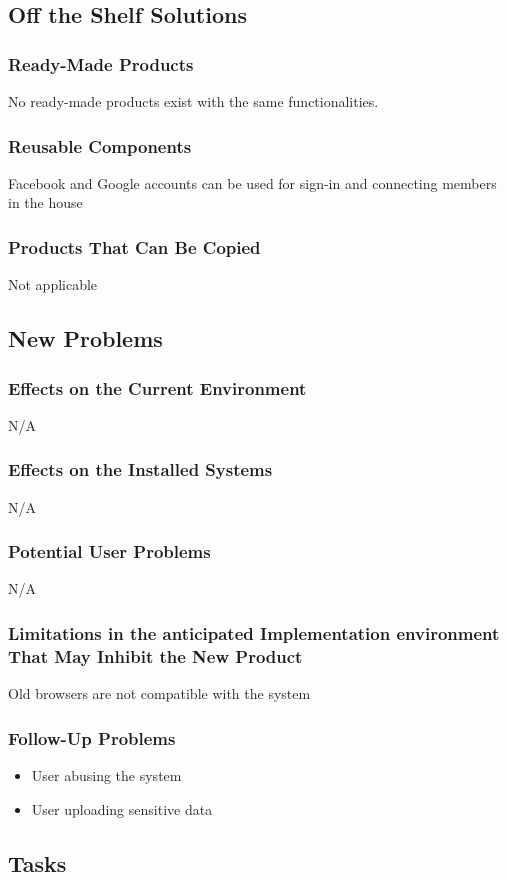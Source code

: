 \documentclass[12pt, titlepage]{article}
\begin{document}
{\subsection{Off the Shelf Solutions}
\subsubsection{Ready-Made Products}
No ready-made products exist with the same functionalities. 
\subsubsection{Reusable Components}
Facebook and Google accounts can be used for sign-in and connecting members in the house
\subsubsection{Products That Can Be Copied}
Not applicable
\subsection{New Problems}
\subsubsection{Effects on the Current Environment}
N/A
\subsubsection{Effects on the Installed Systems}
N/A
\subsubsection{Potential User Problems}
N/A
\subsubsection{Limitations in the anticipated Implementation environment That May Inhibit the New Product}
Old browsers are not compatible with the system
\subsubsection{Follow-Up Problems}
\begin{itemize}
  \item User abusing the system
  \item User uploading sensitive data 
\end{itemize}

\subsection{Tasks}
}
\end{document}
